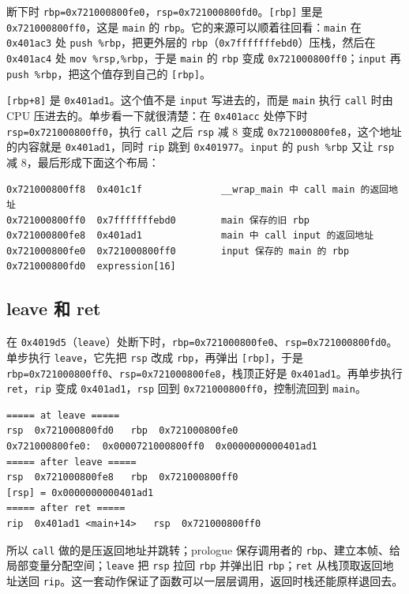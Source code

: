 \documentclass[UTF8,11pt,fontset=fandol]{ctexart}
\newcommand{\code}[1]{\texttt{#1}}
\begin{document}
断下时 \code{rbp=0x721000800fe0}，\code{rsp=0x721000800fd0}。\code{[rbp]} 里是 \code{0x721000800ff0}，这是 \code{main} 的 \code{rbp}。它的来源可以顺着往回看：\code{main} 在 \code{0x401ac3} 处 \code{push \%rbp}，把更外层的 \code{rbp}（\code{0x7fffffffebd0}）压栈，然后在 \code{0x401ac4} 处 \code{mov \%rsp,\%rbp}，于是 \code{main} 的 \code{rbp} 变成 \code{0x721000800ff0}；\code{input} 再 \code{push \%rbp}，把这个值存到自己的 \code{[rbp]}。

\code{[rbp+8]} 是 \code{0x401ad1}。这个值不是 \code{input} 写进去的，而是 \code{main} 执行 \code{call} 时由 CPU 压进去的。单步看一下就很清楚：在 \code{0x401acc} 处停下时 \code{rsp=0x721000800ff0}，执行 \code{call} 之后 \code{rsp} 减 8 变成 \code{0x721000800fe8}，这个地址的内容就是 \code{0x401ad1}，同时 \code{rip} 跳到 \code{0x401977}。\code{input} 的 \code{push \%rbp} 又让 \code{rsp} 减 8，最后形成下面这个布局：

\begin{lstlisting}
0x721000800ff8  0x401c1f              __wrap_main 中 call main 的返回地址
0x721000800ff0  0x7fffffffebd0        main 保存的旧 rbp
0x721000800fe8  0x401ad1              main 中 call input 的返回地址
0x721000800fe0  0x721000800ff0        input 保存的 main 的 rbp
0x721000800fd0  expression[16]
\end{lstlisting}

\subsection{leave 和 ret}

在 \code{0x4019d5}（\code{leave}）处断下时，\code{rbp=0x721000800fe0}、\code{rsp=0x721000800fd0}。单步执行 \code{leave}，它先把 \code{rsp} 改成 \code{rbp}，再弹出 \code{[rbp]}，于是 \code{rbp=0x721000800ff0}、\code{rsp=0x721000800fe8}，栈顶正好是 \code{0x401ad1}。再单步执行 \code{ret}，\code{rip} 变成 \code{0x401ad1}，\code{rsp} 回到 \code{0x721000800ff0}，控制流回到 \code{main}。

\begin{lstlisting}
===== at leave =====
rsp  0x721000800fd0   rbp  0x721000800fe0
0x721000800fe0:  0x0000721000800ff0  0x0000000000401ad1
===== after leave =====
rsp  0x721000800fe8   rbp  0x721000800ff0
[rsp] = 0x0000000000401ad1
===== after ret =====
rip  0x401ad1 <main+14>   rsp  0x721000800ff0
\end{lstlisting}

所以 \code{call} 做的是压返回地址并跳转；prologue 保存调用者的 \code{rbp}、建立本帧、给局部变量分配空间；\code{leave} 把 \code{rsp} 拉回 \code{rbp} 并弹出旧 \code{rbp}；\code{ret} 从栈顶取返回地址送回 \code{rip}。这一套动作保证了函数可以一层层调用，返回时栈还能原样退回去。
\end{document}
